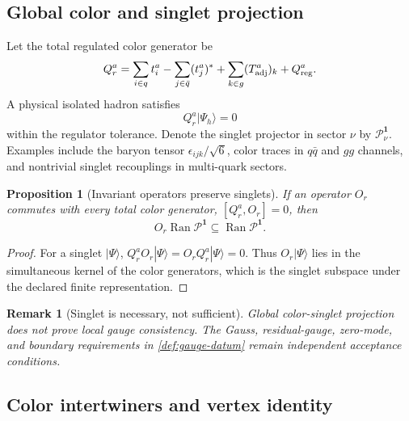 \documentclass[11pt]{article}
\newtheorem{proposition}[definition]{Proposition}
\newtheorem{remark}[definition]{Remark}
\newcommand{\Ran}{\operatorname{Ran}}
\newcommand{\cP}{\mathcal P}
\newcommand{\comm}[2]{[#1,#2]}
\begin{document}
\subsection{Global color and singlet projection}

Let the total regulated color generator be
\begin{equation}
 Q_r^a
 =\sum_{i\in q}t_i^a
 -\sum_{j\in\bar q}(t_j^a)^*
 +\sum_{k\in g}(T_{\rm adj}^a)_k
 +Q_{\rm reg}^a.
\label{eq:total-color-generator}
\end{equation}
A physical isolated hadron satisfies
\begin{equation}
 Q_r^a|\Psi_h\rangle=0
\label{eq:color-singlet-condition}
\end{equation}
within the regulator tolerance.  Denote the singlet projector in sector
\(\nu\) by \(\cP_{\nu}^{\bm1}\).  Examples include the baryon tensor
\(\epsilon_{ijk}/\sqrt6\), color traces in \(q\bar q\) and \(gg\) channels,
and nontrivial singlet recouplings in multi-quark sectors.

\begin{proposition}[Invariant operators preserve singlets]
\label{prop:singlet-preservation}
If an operator \(O_r\) commutes with every total color generator,
\(\comm{Q_r^a}{O_r}=0\), then
\begin{equation}
 O_r\Ran\cP^{\bm1}\subseteq\Ran\cP^{\bm1}.
\label{eq:singlet-preservation}
\end{equation}
\end{proposition}

\begin{proof}
For a singlet \(|\Psi\rangle\),
\(Q_r^aO_r|\Psi\rangle=O_rQ_r^a|\Psi\rangle=0\).  Thus
\(O_r|\Psi\rangle\) lies in the simultaneous kernel of the color generators,
which is the singlet subspace under the declared finite representation.
\end{proof}

\begin{remark}[Singlet is necessary, not sufficient]
Global color-singlet projection does not prove local gauge consistency.  The
Gauss, residual-gauge, zero-mode, and boundary requirements in
\cref{def:gauge-datum} remain independent acceptance conditions.
\end{remark}

\subsection{Color intertwiners and vertex identity}
\end{document}

